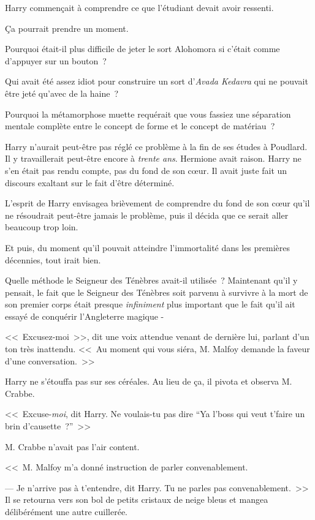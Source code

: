Harry commençait à comprendre ce que l'étudiant devait avoir ressenti.

Ça pourrait prendre un moment.

Pourquoi était-il plus difficile de jeter le sort Alohomora si c'était comme d'appuyer sur un bouton~?

Qui avait été assez idiot pour construire un sort d'\emph{Avada Kedavra} qui ne pouvait être jeté qu'avec de la haine~?

Pourquoi la métamorphose muette requérait que vous fassiez une séparation mentale complète entre le concept de forme et le concept de matériau~?

Harry n'aurait peut-être pas réglé ce problème à la fin de ses études à Poudlard. Il y travaillerait peut-être encore à \emph{trente ans}. Hermione avait raison. Harry ne s'en était pas rendu compte, pas du fond de son cœur. Il avait juste fait un discours exaltant sur le fait d'être déterminé.

L'esprit de Harry envisagea brièvement de comprendre du fond de son cœur qu'il ne résoudrait peut-être jamais le problème, puis il décida que ce serait aller beaucoup trop loin.

Et puis, du moment qu'il pouvait atteindre l'immortalité dans les premières décennies, tout irait bien.

Quelle méthode le Seigneur des Ténèbres avait-il utilisée~? Maintenant qu'il y pensait, le fait que le Seigneur des Ténèbres soit parvenu à survivre à la mort de son premier corps était presque \emph{infiniment} plus important que le fait qu'il ait essayé de conquérir l'Angleterre magique -

<<~Excusez-moi~>>, dit une voix attendue venant de dernière lui, parlant d'un ton très inattendu. <<~Au moment qui vous siéra, M. Malfoy demande la faveur d'une conversation.~>>

Harry ne s'étouffa pas sur ses céréales. Au lieu de ça, il pivota et observa M. Crabbe.

<<~Excuse-\emph{moi}, dit Harry. Ne voulais-tu pas dire “Ya l'boss qui veut t'faire un brin d'causette~?”~>>

M. Crabbe n'avait pas l'air content.

<<~M. Malfoy m'a donné instruction de parler convenablement.

--- Je n'arrive pas à t'entendre, dit Harry. Tu ne parles pas convenablement.~>> Il se retourna vers son bol de petits cristaux de neige bleus et mangea délibérément une autre cuillerée.

